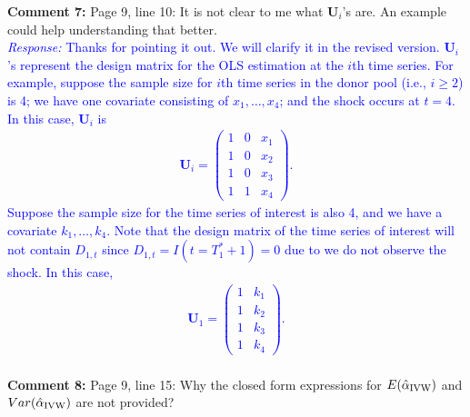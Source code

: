 \documentclass[12pt]{article}
\newcommand{\response}[1]{\noindent \textcolor{blue}{\emph{Response:} #1}}
\begin{document}
{\bf Comment 7:} Page 9, line 10: It is not clear to me what $\mathbf{U}_i$'s are. An example could help understanding that better. \\


\response{Thanks for pointing it out. We will clarify it in the revised version. $\mathbf{U}_i$'s represent the design matrix for the OLS estimation at the $i$th time series. For example, suppose the sample size for $i$th time series in the donor pool (i.e., $i\geq 2$) is 4; we have one covariate consisting of $x_1, \ldots, x_4$; and the shock occurs at $t = 4$. In this case, $\mathbf{U}_i$ is 
\begin{align*}
  \mathbf{U}_i = \begin{pmatrix}
    1 & 0 & x_1 \\
    1 & 0 & x_2 \\
    1 & 0 & x_3 \\
    1 & 1 & x_4
  \end{pmatrix}.
\end{align*}
Suppose the sample size for the time series of interest is also 4, and we have a covariate $k_1, \ldots, k_4$. Note that the design matrix of the time series of interest will not contain $D_{1,t}$ since $D_{1,t}= I(t=T_1^*+1)=0$ due to we do not observe the shock. In this case, 
\begin{align*}
  \mathbf{U}_1 = \begin{pmatrix}
    1 &  k_1 \\
    1 &  k_2 \\
    1 &  k_3 \\
    1 &  k_4
  \end{pmatrix}.
\end{align*}} \\

{\bf Comment 8:} Page 9, line 15: Why the closed form expressions for $E(\hat{\alpha}_{\rm IVW})$ and $Var(\hat{\alpha}_{\rm IVW})$ are not provided? \\
\end{document}
